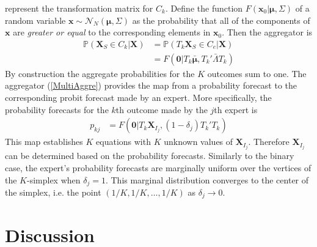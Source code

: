 \documentclass[11pt,twoside]{article}
\renewcommand{\P}{\mathbb{P}}
\theoremstyle{definition}
\theoremstyle{definition}
\begin{document}
represent the transformation matrix for $C_k$. Define the function $F(\boldsymbol{x}_0 | \boldsymbol{\mu}, \Sigma)$ of a random variable $\boldsymbol{x} \sim \mathcal{N}_N(\boldsymbol{\mu}, \Sigma)$ as the probability that all of the components of $\boldsymbol{x}$ are \textit{greater or equal} to the corresponding elements in $\boldsymbol{x}_0$. Then the aggregator is 
\begin{align}
\P(\boldsymbol{X}_S \in C_k | \boldsymbol{X}) &= \P(T_k \boldsymbol{X}_S \in C_e | \boldsymbol{X}) \nonumber\\
&= F(\boldsymbol{0} | T_k\boldsymbol{\bar{\mu}}, T_k' \bar{\Lambda}T_k) \label{MultiAggre}
\end{align}
By construction the aggregate probabilities for the $K$ outcomes sum to one. The aggregator (\ref{MultiAggre}) provides the map from a probability forecast to the corresponding probit forecast made by an expert. More specifically, the probability forecasts for the $k$th outcome made by the $j$th expert is
\begin{align*}
p_{kj}&= F(\boldsymbol{0} | T_k\boldsymbol{X}_{I_j}, (1-\delta_j)T_k'T_k)
\end{align*}
This map establishes $K$ equations with $K$ unknown values of $\boldsymbol{X}_{I_j}$. Therefore $\boldsymbol{X}_{I_j}$ can be determined based on the probability forecasts. Similarly to the binary case, the expert's probability forecasts are marginally uniform over the vertices of the $K$-simplex when $\delta_j = 1$. This marginal distribution converges to the center of the simplex, i.e. the point $(1/K, 1/K, \dots, 1/K)$ as $\delta_j \to 0$. 



\section{Discussion}

\end{document}
